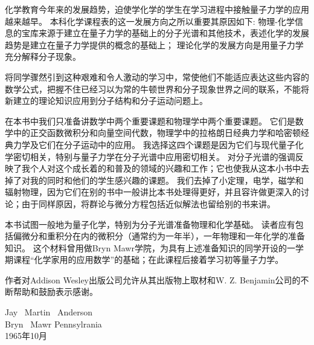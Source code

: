 化学教育今年来的发展趋势，迫使学化学的学生在学习进程中接触量子力学的应用越来越早。
本科化学课程表的这一发展方向之所以重要其原因如下:
物理-化学信息的宝库来源于建立在量子力学的基础上的分子光谱和其他技术，表述化学的发展趋势是建立在量子力学提供的概念的基础上；
理论化学的发展方向是用量子力学充分解释分子现象。

将同学骤然引到这种艰难和令人激动的学习中，常使他们不能适应表达这些内容的数学公式，把握不住已经习以为常的牛顿世界和分子现象世界之间的联系，不能将新建立的理论知识应用到分子结构和分子运动问题上。

在本书中我们只准备讲数学中两个重要课题和物理学中两个重要课题。
它们是数学中的正交函数微积分和向量空间代数，物理学中的拉格朗日经典力学和哈密顿经典力学及它们在分子运动中的应用。
我选择这四个课题是因为它们与现代量子化学密切相关，特别与量子力学在分子光谱中应用密切相关。
对分子光谱的强调反映了我个人对这个成长着的和普及的领域的兴趣和工作；它也使我从这本小书中去掉了对我的同时和他们的学生感兴趣的课题。
我们去掉了小定理，电学，磁学和辐射物理，因为它们在别的书中一般讲比本书处理得更好，并且容许做更深入的讨论；由于同样原因，将群论与微分方程包括近似解法也留给别的书来讲。

本书试图一般地为量子化学，特别为分子光谱准备物理和化学基础。
读者应有包括偏微分和重积分在内的微积分（通常约为一年半），一年物理和一年化学的准备知识。
这个材料曾用做Bryn Mawr学院，为具有上述准备知识的同学开设的一学期课程“化学家用的应用数学”的基础；在此课程后接着学习初等量子力学。

作者对Addison Wesley出版公司允许从其出版物上取材和W. Z. Benjamin公司的不断帮助和鼓励表示感谢。
\begin{flushright}
    Jay \ Martin \ Anderson \\
    Bryn \ Mawr Pennsylrania \\
    1965年10月
\end{flushright}